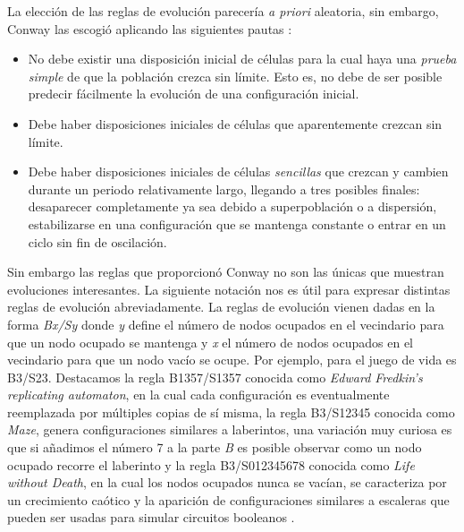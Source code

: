 \documentclass[../proyecto.tex]{memoir}
\begin{document}
La elección de las reglas de evolución parecería \textit{a priori} aleatoria, sin embargo, Conway las escogió aplicando las siguientes pautas \cite{libroGardner}:
\begin{itemize}
	\item No debe existir una disposición inicial de células para la cual haya una \textit{prueba simple} de que la población crezca sin límite. Esto es, no debe de ser posible predecir fácilmente la evolución de una configuración inicial.
	\item Debe haber disposiciones iniciales de células que aparentemente crezcan sin límite. 
	\item Debe haber disposiciones iniciales de células \textit{sencillas} que crezcan y cambien durante un periodo relativamente largo, llegando a tres posibles finales: desaparecer completamente ya sea debido a superpoblación o a dispersión, estabilizarse en una configuración que se mantenga constante o entrar en un ciclo sin fin de oscilación.
\end{itemize}

Sin embargo las reglas que proporcionó Conway no son las únicas que muestran evoluciones interesantes. La siguiente notación nos es útil para expresar distintas reglas de evolución abreviadamente. La reglas de evolución vienen dadas en la forma \textit{Bx/Sy} donde \textit{y} define el número de nodos ocupados en el vecindario para que un nodo ocupado se mantenga y \textit{x} el número de nodos ocupados en el vecindario para que un nodo vacío se ocupe. Por ejemplo, para el juego de vida es B3/S23. Destacamos la regla B1357/S1357 conocida como \textit{Edward Fredkin's replicating automaton}, en la cual cada configuración es eventualmente reemplazada por múltiples copias de sí misma, la regla B3/S12345 conocida como \textit{Maze}, genera configuraciones similares a laberintos, una variación muy curiosa es que si añadimos el número 7 a la parte \textit{B} es posible observar como un nodo ocupado recorre el laberinto y la regla B3/S012345678 conocida como \textit{Life without Death}, en la cual los nodos ocupados nunca se vacían, se caracteriza por un crecimiento caótico y la aparición de configuraciones similares a escaleras que pueden ser usadas para simular circuitos booleanos \cite{regla1}.

\end{document}
